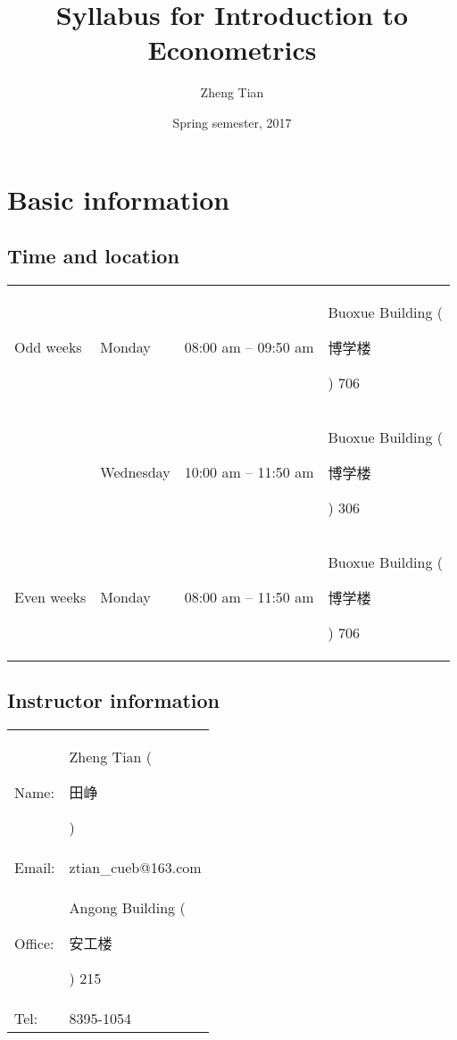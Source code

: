 \documentclass[a4paper,11pt]{article}
\author{Zheng Tian}
\date{Spring semester, 2017}
\title{Syllabus for Introduction to Econometrics}
\begin{document}
\maketitle

\section{Basic information}
\label{sec:org88eaff1}

\subsection*{Time and location}
\label{sec:org379689d}

\begin{center}
\begin{tabular}{llll}
Odd weeks & Monday & 08:00 am -- 09:50 am & Buoxue Building (\begin{CJK}{UTF8}{gbsn}博学楼\end{CJK}) 706\\
 & Wednesday & 10:00 am -- 11:50 am & Buoxue Building (\begin{CJK}{UTF8}{gbsn}博学楼\end{CJK}) 306\\
Even weeks & Monday & 08:00 am -- 11:50 am & Buoxue Building (\begin{CJK}{UTF8}{gbsn}博学楼\end{CJK}) 706\\
\end{tabular}
\end{center}


\subsection*{Instructor information}
\label{sec:orgeb184e7}

\begin{center}
\begin{tabular}{ll}
Name: & Zheng Tian (\begin{CJK*}{UTF8}{gbsn}田峥\end{CJK*})\\
Email: & ztian\_cueb@163.com\\
Office: & Angong Building (\begin{CJK*}{UTF8}{gbsn}安工楼\end{CJK*}) 215\\
Tel: & 8395-1054\\
\end{tabular}
\end{center}
\end{document}
